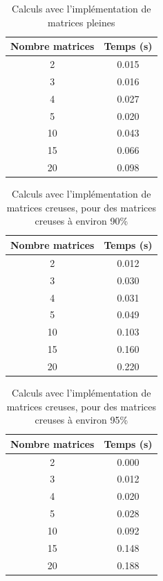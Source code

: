 \documentclass[a4paper]{scrartcl}
\begin{document}
\begin{table}
    \caption{Calculs avec l'implémentation de matrices pleines}
    \label{tab:plein}
    \begin{center}
        \begin{tabular}{c|c}
            Nombre matrices & Temps (s)\\
            \hline
            2 &        0.015 \\
    3 &        0.016 \\
    4 &        0.027 \\
    5 &        0.020 \\
    10 &        0.043\\
    15 &        0.066 \\
    20 &        0.098 \\
        \end{tabular}
    \end{center}
\end{table}
\begin{table}
    \caption{Calculs avec l'implémentation de matrices creuses, pour des matrices creuses à environ 90\%}
    \label{tab:90}
    \begin{center}
        \begin{tabular}{c|c}
            Nombre matrices & Temps (s)\\
            \hline
            2 &        0.012 \\
    3 &        0.030 \\
    4 &        0.031 \\
    5 &        0.049 \\
    10 &        0.103\\
    15 &        0.160 \\
    20 &        0.220 \\
        \end{tabular}
    \end{center}
\end{table}
\begin{table}
    \caption{Calculs avec l'implémentation de matrices creuses, pour des matrices creuses à environ 95\%}
    \label{tab:95}
    \begin{center}
        \begin{tabular}{c|c}
            Nombre matrices & Temps (s)\\
            \hline
            2 &        0.000\\
    3 &        0.012\\
    4 &        0.020\\
    5 &        0.028\\
    10 &        0.092\\
    15 &        0.148\\
    20 &        0.188\\
        \end{tabular}
    \end{center}
\end{table}
\end{document}
